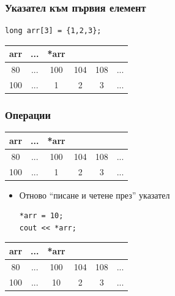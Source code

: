 \documentclass{beamer}
\begin{document}
\begin{frame}[fragile]
\frametitle{Указател към първия елемент}


\begin{flushleft}
\begin{lstlisting}
long arr[3] = {1,2,3};
\end{lstlisting}
\end{flushleft}

\pause

\begin{tabular} {c | c | c | c | c | c }

arr &... &*arr \\\hline
80  &... & 100 & 104 & 108 &... \\\hline
100 &... & 1   & 2   & 3   &... \\\hline

\end{tabular}

\end{frame}




\begin{frame}[fragile]
\frametitle{Операции}


\begin{tabular} {c | c | c | c | c | c }

arr &... &*arr \\\hline
80  &... & 100 & 104 & 108 &... \\\hline
100 &... & 1   & 2   & 3   &... \\\hline

\end{tabular}


\begin{itemize}
  \item Отново ``писане и четене през'' указател
\begin{flushleft}
\begin{lstlisting}
*arr = 10;
cout << *arr;
\end{lstlisting}
\end{flushleft}

\end{itemize}

\pause
\begin{tabular} {c | c | c | c | c | c }

arr &... &*arr \\\hline
80  &... & 100 & 104 & 108 &... \\\hline
100 &... & \alert{10}   & 2   & 3   &... \\\hline

\end{tabular}

\end{frame}
\end{document}
